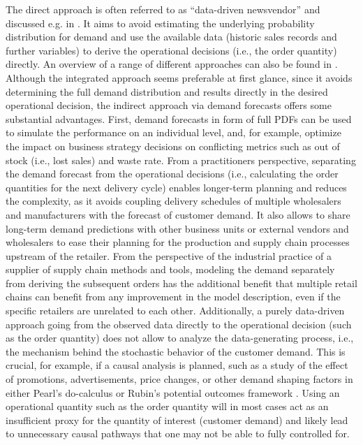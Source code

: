 \documentclass[BCOR=1mm, DIV=calc,10pt,
twoside=true,
twocolumn,
headings=normal]{scrartcl}
\begin{document}
The direct approach is often referred to as ``data-driven newsvendor'' and discussed e.g. in \cite{beutel2012safety,ban2019big,bertsimas2020predictive, oroojlooyjadid2020applying}. It aims to avoid estimating the underlying probability distribution for demand and use the available data (historic sales records and further variables) to derive the operational decisions (i.e., the order quantity) directly. An overview of a range of different approaches can also be found in \cite{huber2019data}. Although the integrated approach seems preferable at first glance, since it avoids determining the full demand distribution and results directly in the desired operational decision, the indirect approach via demand forecasts offers some substantial advantages. First, demand forecasts in form of full PDFs can be used to simulate the performance on an individual level, and, for example, optimize the impact on business strategy decisions on conflicting metrics such as out of stock (i.e., lost sales) and waste rate. From a practitioners perspective, separating the demand forecast from the operational decisions (i.e., calculating the order quantities for the next delivery cycle) enables longer-term planning and reduces the complexity, as it avoids coupling delivery schedules of multiple wholesalers and manufacturers with the forecast of customer demand. It also allows to share long-term demand predictions with other business units or external vendors and wholesalers to ease their planning for the production and supply chain processes upstream of the retailer. From the perspective of the industrial practice of a supplier of supply chain methods and tools, modeling the demand separately from deriving the subsequent orders has the additional benefit that multiple retail chains can benefit from any improvement in the model description, even if the specific retailers are unrelated to each other. Additionally, a purely data-driven approach going from the observed data directly to the operational decision (such as the order quantity) does not allow to analyze the data-generating process, i.e., the mechanism behind the stochastic behavior of the customer demand. This is crucial, for example, if a causal analysis is planned, such as a study of the effect of promotions, advertisements, price changes, or other demand shaping factors in either Pearl's do-calculus \cite{PearlCausality} or Rubin's potential outcomes framework \cite{rubin1974estimating}. Using an operational quantity such as the order quantity will in most cases act as an insufficient proxy for the quantity of interest (customer demand) and likely lead to unnecessary causal pathways that one may not be able to  fully controlled for.
\end{document}
